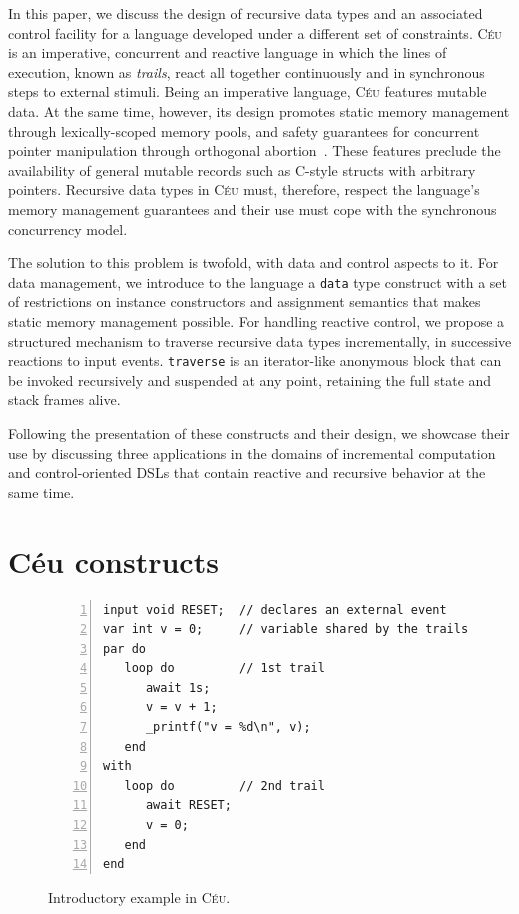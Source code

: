 \documentclass{acm_proc_article-sp}
\newcommand{\CEU}{\textsc{C\'{e}u}\xspace}
\newcommand{\code}[1] {{\small{\texttt{#1}}}}
\begin{document}
In this paper, we discuss the design of recursive data types and an associated
control facility for a language developed under a different set of
constraints. \CEU~\cite{ceu.sensys13} is an imperative, concurrent and
reactive language in which the lines of execution, known as \emph{trails},
react all together continuously and in synchronous steps to external stimuli.
Being an imperative language, \CEU features mutable data. At the same time,
however, its design promotes static memory management through lexically-scoped
memory pools, and safety guarantees for concurrent pointer manipulation
through orthogonal abortion~\cite{ceu.mod15}. These features preclude the
availability of general mutable records such as C-style structs with arbitrary
pointers. Recursive data types in \CEU must, therefore, respect the language's
memory management guarantees and their use must cope with the synchronous
concurrency model.

The solution to this problem is twofold, with data and control aspects to it.
For data management, we introduce to the language a \code{data} type construct
with a set of restrictions on instance constructors and assignment semantics
that makes static memory management possible. For handling reactive control,
we propose a structured mechanism to traverse recursive data types
incrementally, in successive reactions to input events. \code{traverse} is an
iterator-like anonymous block that can be invoked recursively and suspended at
any point, retaining the full state and stack frames alive.

Following the presentation of these constructs and their design, we showcase
their use by discussing three applications in the domains of incremental
computation and control-oriented DSLs that contain reactive and recursive
behavior at the same time.

\section{C\'eu constructs}

\begin{figure}%
\begin{lstlisting}[numbers=left,xleftmargin=3em]
input void RESET;  // declares an external event
var int v = 0;     // variable shared by the trails
par do
   loop do         // 1st trail
      await 1s;
      v = v + 1;
      _printf("v = %d\n", v);
   end
with
   loop do         // 2nd trail
      await RESET;
      v = 0;
   end
end
\end{lstlisting}
\caption{ Introductory example in \CEU.
\label{lst.intro}
}
\end{figure}
\end{document}

